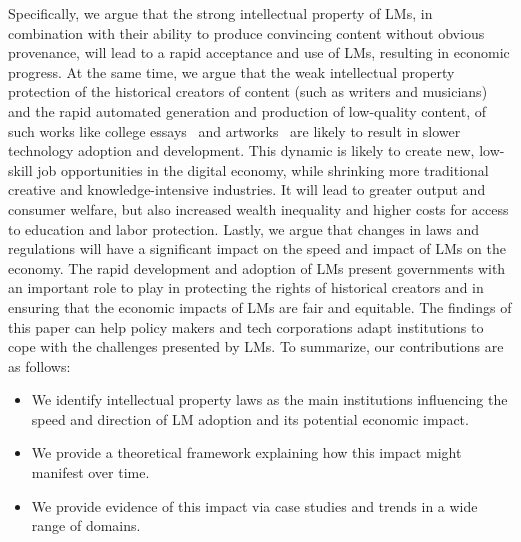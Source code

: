 Specifically, we argue that the strong intellectual property of LMs, in combination with their ability to produce convincing content without obvious provenance, will lead to a rapid acceptance and use of LMs, resulting in economic progress.
At the same time, we argue that the weak intellectual property protection of the historical creators of content (such as writers and musicians) and the rapid automated generation and production of low-quality content, of such works like college essays~\citep{thompson2022chatgpt} and artworks~\citep{hullman2023artificial} are likely to result in slower technology adoption and development.
This dynamic is likely to create new, low-skill job opportunities in the digital economy, while shrinking more traditional creative and knowledge-intensive industries.
It will lead to greater output and consumer welfare, but also increased wealth inequality and higher costs for access to education and labor protection.
Lastly, we argue that changes in laws and regulations will have a significant impact on the speed and impact of LMs on the economy. 
The rapid development and adoption of LMs present governments with an important role to play in protecting the rights of historical creators and in ensuring that the economic impacts of LMs are fair and equitable. 
The findings of this paper can help policy makers and tech corporations adapt institutions to cope with the challenges presented by LMs. 
To summarize, our contributions are as follows:
\begin{itemize}[wide,labelindent=0pt, itemsep=1pt, topsep=0pt]
    \item We identify intellectual property laws as the main institutions influencing the speed and direction of LM adoption and its potential economic impact.
    \item We provide a theoretical framework explaining how this impact might manifest over time.
    \item We provide evidence of this impact via case studies and trends in a wide range of domains.
\end{itemize}



